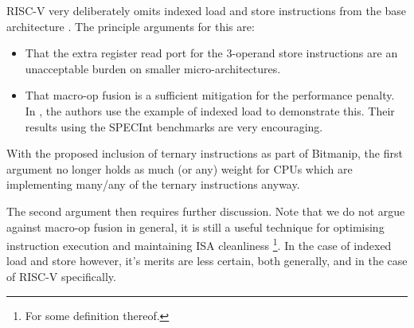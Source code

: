 
RISC-V very deliberately omits indexed load and store instructions
from the base architecture \cite{CDPA:16}.
The principle arguments for this are:

\begin{itemize}
\item That the extra register read port for the 3-operand store instructions
    are an unacceptable burden on smaller micro-architectures.
\item That macro-op fusion is a sufficient mitigation for the performance
    penalty.
    In \cite[Sections V, VI]{CDPA:16}, the authors use the example of
    indexed load to demonstrate this.
    Their results using the SPECInt benchmarks are very encouraging.
\end{itemize}

With the proposed inclusion of ternary instructions as part of Bitmanip, the
first argument no longer holds as much (or any) weight for CPUs which are
implementing many/any of the ternary instructions anyway.

The second argument then requires further discussion.
Note that we do not argue against macro-op fusion in general, it
is still a useful technique for optimising instruction execution
and maintaining ISA cleanliness \footnote{For some definition thereof.}.
In the case of indexed load and store however, it's merits are
less certain, both generally, and in the case of RISC-V specifically.

